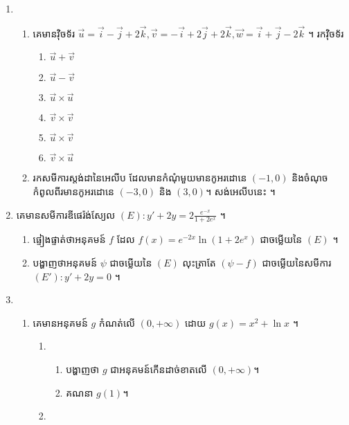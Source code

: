 \documentclass{officialexam}
\begin{document}
\begin{enumerate}[I]
\begin{enumerate}[k]
		\end{enumerate}
		\item \begin{enumerate}[1]
			\item គេមានវ៉ិចទ័រ $\overrightarrow{u}=\vec{i}-\vec{j}+2\vec{k}, \overrightarrow{v}=-\vec{i}+2\vec{j}+2\vec{k}, \overrightarrow{w}=\vec{i}+\vec{j}-2\vec{k}$ ។ រកវ៉ិចទ័រ
			\begin{enumerate}[k,6]
				\item $\overrightarrow{u}+\overrightarrow{v}$
				\item $\overrightarrow{u}-\overrightarrow{v}$
				\item $\overrightarrow{u}\times\overrightarrow{u}$
				\item $\overrightarrow{v}\times\overrightarrow{v}$
				\item $\overrightarrow{u}\times\overrightarrow{v}$
				\item $\overrightarrow{v}\times\overrightarrow{u}$
			\end{enumerate}
			\item រកសមីការស្តង់ដានៃអេលីប ដែលមានកំណុំមួយមានកូអរដោនេ $\left(-1,0\right)$ និងចំណុចកំពូលពីរមានកូអរដោនេ $\left(-3,0\right)$ និង $\left(3,0\right)$។ សង់អេលីបនេះ ។
		\end{enumerate}
		\item គេមានសមីការឌីផេរ៉ង់ស្យែល $(E): y'+2y=2\frac{e^{-x}}{1+2e^x}$ ។
		\begin{enumerate}[k]
			\item ផ្ទៀងផ្ទាត់ថាអនុគមន៍ $f$ ដែល $f(x)=e^{-2x}\ln\left(1+2e^x\right)$ ជាចម្លើយនៃ $(E)$ ។
			\item បង្ហាញថាអនុគមន៍ $\psi$ ជាចម្លើយនៃ $(E)$ លុះត្រាតែ $\left(\psi-f\right)$ ជាចម្លើយនៃសមីការ $(E'): y'+2y=0$ ។
		\end{enumerate}
		\item \begin{enumerate}[A]
			\item គេមានអនុគមន៍ $g$ កំណត់លើ $\left(0, +\infty\right)$ ដោយ $g(x)=x^2+\ln x$ ។
			\begin{enumerate}[1]
				\item \begin{enumerate}[k]
					\item បង្ហាញថា $g$ ជាអនុគមន៍កើនដាច់ខាតលើ $\left(0, +\infty\right)$។
					\item គណនា $g(1)$។
				\end{enumerate}
				\item \begin{enumerate}[k]

\end{enumerate}
\end{enumerate}
\end{enumerate}
\end{enumerate}
\end{document}
